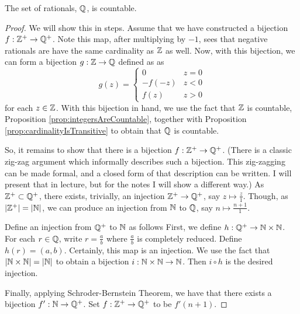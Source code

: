 \guard





\begin{prop}
\label{prop:rationalsAreCountable}
  The set of rationals, $\mathbb{Q}$, is countable.
\end{prop}
\begin{proof}
  We will show this in steps.
  Assume that we have constructed a bijection $f:\mathbb{Z}^+\to \mathbb{Q}^+$.
  Note this map, after multiplying by $-1$, sees that negative rationals are have the same cardinality as $\mathbb{Z}$ as well.
  Now, with this bijection, we can form a bijection $g:\mathbb{Z}\to\mathbb{Q}$ defined as as \[ g(z) = \begin{cases}
      0 & z= 0 \\
      -f(-z) & z<0 \\
      f(z) & z>0
   \end{cases} \]
   for each $z\in\mathbb{Z}$.
   With this bijection in hand, we use the fact that $\mathbb{Z}$ is countable, Proposition \ref{prop:integersAreCountable}, together with Proposition \ref{prop:cardinalityIsTransitive} to obtain that $\mathbb{Q}$ is countable.

   So, it remains to show that there is a bijection $f:\mathbb{Z}^+\to\mathbb{Q}^+$.
   (There is a classic zig-zag argument which informally describes such a bijection. This zig-zagging can be made formal, and a closed form of that description can be written. I will present that in lecture, but for the notes I will show a different way.)
   As $\mathbb{Z}^+\subset \mathbb{Q}^+$, there exists, trivially, an injection $\mathbb{Z}^+\to\mathbb{Q}^+$, say $z\mapsto \frac{z}{1}$.
   Though, as $\vert \mathbb{Z}^+\vert=\vert\mathbb{N}\vert$, we can produce an injection from $\mathbb{N}$ to $\mathbb{Q}$, say $n\mapsto \frac{n+1}{1}$.

   Define an injection from $\mathbb{Q}^+$ to $\mathbb{N}$ as follows
   First, we define $h:\mathbb{Q}^+\to\mathbb{N}\times\mathbb{N}$.
   For each $r\in\mathbb{Q}$, write $r=\frac{a}{b}$ where $\frac{a}{b}$ is completely reduced.
   Define $h(r)=(a,b)$.
   Certainly, this map is an injection.
   We use the fact that $\vert\mathbb{N}\times\mathbb{N}\vert=\vert\mathbb{N}\vert$ to obtain a bijection $i:\mathbb{N}\times\mathbb{N}\to\mathbb{N}$.
   Then $i\circ h$ is the desired injection.

   Finally, applying Schroder-Bernstein Theorem, we have that there exists a bijection $f':\mathbb{N}\to\mathbb{Q}^+$.
   Set $f:\mathbb{Z}^+\to\mathbb{Q}^+$ to be $f'(n+1)$.
\end{proof}
